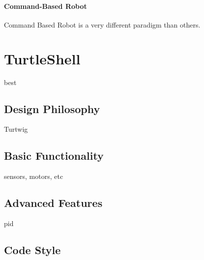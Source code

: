 \documentclass[]{report}
\begin{document}
\subsubsection{Command-Based Robot}
Command Based Robot is a very different paradigm than others.


\chapter{TurtleShell}
\label{TurtleShell}
best
\section{Design Philosophy}
Turtwig
\section{Basic Functionality}
sensors, motors, etc
\section{Advanced Features}
pid
\section{Code Style}
\end{document}
